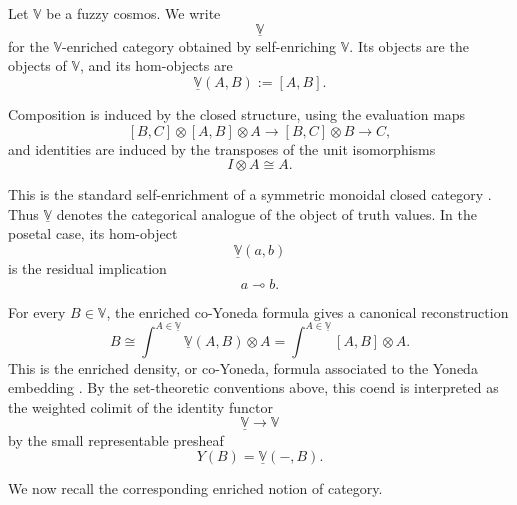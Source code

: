 \begin{definition}\label{def:self-enrichment}
    Let \(\mathbb V\) be a fuzzy cosmos. We write
    \[
        \underline{\mathbb V}
    \]
    for the \(\mathbb V\)-enriched category obtained by self-enriching \(\mathbb V\). Its objects are the objects of \(\mathbb V\), and its hom-objects are
    \[
        \underline{\mathbb V}(A,B):=[A,B].
    \]

    Composition is induced by the closed structure, using the evaluation maps
    \[
        [B,C]\otimes[A,B]\otimes A
        \longrightarrow
        [B,C]\otimes B
        \longrightarrow
        C,
    \]
    and identities are induced by the transposes of the unit isomorphisms
    \[
        I\otimes A\cong A.
    \]
\end{definition}

This is the standard self-enrichment of a symmetric monoidal closed category \cite[Section~1.6, especially formula~(1.28)]{Kelly1982BasicConcepts}. Thus \(\underline{\mathbb V}\) denotes the categorical analogue of the object of truth values. In the posetal case, its hom-object
\[
    \underline{\mathbb V}(a,b)
\]
is the residual implication
\[
    a\multimap b.
\]

\begin{remark}\label{rem:canonical-density}
    For every \(B\in\mathbb V\), the enriched co-Yoneda formula gives a canonical reconstruction
    \[
        B
        \cong
        \int^{A\in\underline{\mathbb V}}
        \underline{\mathbb V}(A,B)\otimes A
        =
        \int^{A\in\underline{\mathbb V}}
        [A,B]\otimes A.
    \]
    This is the enriched density, or co-Yoneda, formula associated to the Yoneda embedding \cite[Section~1.9; Section~3.1, especially formula~(3.17); Section~4.2, formula~(4.31); Section~5.1]{Kelly1982BasicConcepts}. By the set-theoretic conventions above, this coend is interpreted as the weighted colimit of the identity functor
    \[
        \underline{\mathbb V}\to \mathbb V
    \]
    by the small representable presheaf
    \[
        Y(B)=\underline{\mathbb V}(-,B).
    \]
\end{remark}

We now recall the corresponding enriched notion of category.

